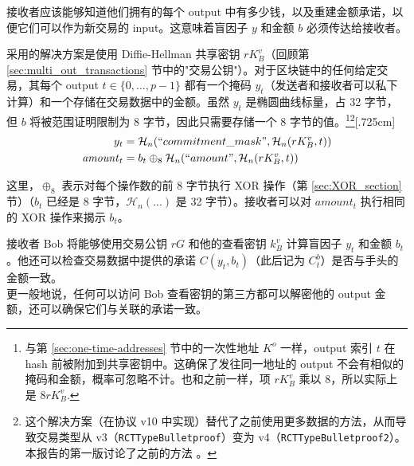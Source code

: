 接收者应该能够知道他们拥有的每个 output 中有多少钱，以及重建金额承诺，以便它们可以作为新交易的 input。这意味着盲因子 $y$ 和金额 $b$ 必须传达给接收者。

采用的解决方案是使用 Diffie-Hellman 共享密钥 $r K_B^v$（回顾第 \ref{sec:multi_out_transactions} 节中的"交易公钥"）。对于区块链中的任何给定交易，其每个 output $t \in \{0, ..., p-1\}$ 都有一个掩码 $y_t$（发送者和接收者可以私下计算）和一个存储在交易数据中的{金额}。虽然 $y_t$ 是椭圆曲线标量，占 32 字节，但 $b$ 将被范围证明限制为 8 字节，因此只需要存储一个 8 字节的值。\footnote{与第 \ref{sec:one-time-addresses} 节中的一次性地址 $K^o$ 一样，output 索引 $t$ 在 hash 前被附加到共享密钥中。这确保了发往同一地址的 output 不会有相似的掩码和{金额}，概率可忽略不计。也和之前一样，项 $r K^v_B$ 乘以 8，所以实际上是 $8rK^v_B.$}\footnote{这个解决方案（在协议 v10 中实现）替代了之前使用更多数据的方法，从而导致交易类型从 v3（{\tt RCTTypeBulletproof}）变为 v4（{\tt RCTTypeBulletproof2}）。本报告的第一版讨论了之前的方法 \cite{ztm-1}。}[.725cm]\vspace{.175cm}%
\begin{align*}
  y_t &= \mathcal{H}_n(``commitment\_mask",\mathcal{H}_n(r K_B^v, t)) \\
  \mathit{amount}_t &= b_t \oplus_8 \mathcal{H}_n(``amount", \mathcal{H}_n(r K_B^v, t))
\end{align*}

这里，$\oplus_8$ 表示对每个操作数的前 8 字节执行 XOR 操作（第 \ref{sec:XOR_section} 节）（$b_t$ 已经是 8 字节，$\mathcal{H}_n(...)$ 是 32 字节）。接收者可以对 $\mathit{amount}_t$ 执行相同的 XOR 操作来揭示 $b_t$。

接收者 Bob 将能够使用交易公钥 $r G$ 和他的查看密钥 $k_B^v$ 计算盲因子 $y_t$ 和金额 $b_t$。他还可以检查交易数据中提供的承诺 $C(y_t, b_t)$（此后记为 $C_t^b$）是否与手头的金额一致。\\

更一般地说，任何可以访问 Bob 查看密钥的第三方都可以解密他的 output 金额，还可以确保它们与关联的承诺一致。



